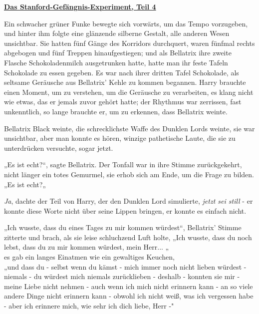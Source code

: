 

\hypertarget{das-stanford-gefuxe4ngnis-experiment-teil-4}{%

\textbf{\uline{Das Stanford-Gefängnis-Experiment, Teil 4}}

\hfill\break Ein schwacher grüner Funke bewegte sich vorwärts, um das Tempo vorzugeben, und hinter ihm folgte eine glänzende silberne Gestalt, alle anderen Wesen unsichtbar. Sie hatten fünf Gänge des Korridors durchquert, waren fünfmal rechts abgebogen und fünf Treppen hinaufgestiegen; und als Bellatrix ihre zweite Flasche Schokoladenmilch ausgetrunken hatte, hatte man ihr feste Tafeln Schokolade zu essen gegeben. Es war nach ihrer dritten Tafel Schokolade, als seltsame Geräusche aus Bellatrix' Kehle zu kommen begannen. Harry brauchte einen Moment, um zu verstehen, um die Geräusche zu verarbeiten, es klang nicht wie etwas, das er jemals zuvor gehört hatte; der Rhythmus war zerrissen, fast unkenntlich, so lange brauchte er, um zu erkennen, dass Bellatrix weinte.

Bellatrix Black weinte, die schrecklichste Waffe des Dunklen Lords weinte, sie war unsichtbar, aber man konnte es hören, winzige pathetische Laute, die sie zu unterdrücken versuchte, sogar jetzt.

„Es ist echt?“, sagte Bellatrix. Der Tonfall war in ihre Stimme zurückgekehrt, nicht länger ein totes Gemurmel, sie erhob sich am Ende, um die Frage zu bilden. „Es ist echt?„

\emph{Ja}, dachte der Teil von Harry, der den Dunklen Lord simulierte, \emph{jetzt sei still} - er konnte diese Worte nicht über seine Lippen bringen, er konnte es einfach nicht.

„Ich wusste, dass du eines Tages zu mir kommen würdest“, Bellatrix' Stimme zitterte und brach, als sie leise schluchzend Luft holte, „Ich wusste, dass du noch lebst, dass du zu mir kommen würdest, mein Herr... „\\ es gab ein langes Einatmen wie ein gewaltiges Keuchen,\\ „und dass du - selbst wenn du kämst - mich immer noch nicht lieben würdest - niemals - du würdest mich niemals zurücklieben - deshalb - konnten sie mir - meine Liebe nicht nehmen - auch wenn ich mich nicht erinnern kann - an so viele andere Dinge nicht erinnern kann - obwohl ich nicht weiß, was ich vergessen habe - aber ich erinnere mich, wie sehr ich dich liebe, Herr -"

}

